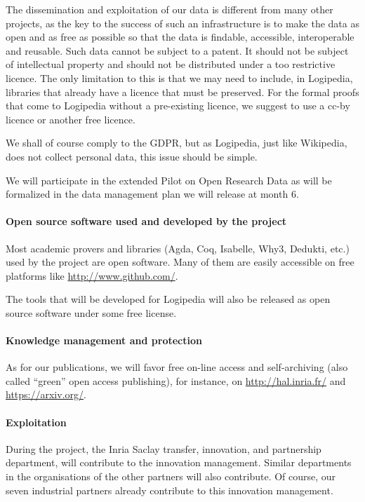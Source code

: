 The dissemination and exploitation of our data is different from many
other projects, as the key to the success of such an infrastructure is
to make the data as open and as free as possible so that the data is
findable, accessible, interoperable and reusable. Such data cannot be
subject to a patent. It should not be subject of intellectual property
and should not be distributed under a too restrictive licence. The only
limitation to this is that we may need to include, in Logipedia,
libraries that already have a licence that must be preserved.  For the
formal proofs that come to Logipedia without a pre-existing licence,
we suggest to use a cc-by licence or another free licence.

We shall of course comply to the GDPR, but as Logipedia, just like 
Wikipedia, does not collect personal data, this issue should be simple.

We will participate in the extended Pilot on Open Research Data as
will be formalized in the data management plan we will release at
month 6.

\paragraph*{Open source software used and developed by the project}

Most academic provers and libraries (Agda, Coq, Isabelle, Why3,
Dedukti, etc.) used by the project are open software. Many of them are
easily accessible on free platforms like \url{http://www.github.com/}.

The tools that will be developed for Logipedia will also be released
as open source software under some free license.

\paragraph*{Knowledge management and protection}

As for our publications, we will favor free on-line access and
self-archiving (also called ``green'' open access publishing), for
instance, on \url{http://hal.inria.fr/} and \url{https://arxiv.org/}.

\paragraph*{Exploitation}

During the project, the Inria Saclay transfer, innovation, and
partnership department, will contribute to the innovation management.
Similar departments in the organisations  of the other partners will 
also contribute. Of course, our seven industrial partners already 
contribute to this innovation management.

